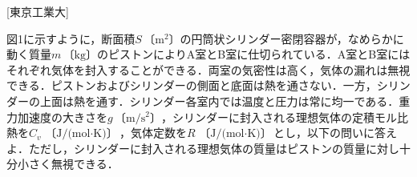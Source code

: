 


\noindent
{} [東京工業大]

図1に示すように，断面積$S \,\text{〔m${}^2$〕}$の円筒状シリンダー密閉容器が，なめらかに動く質量$m\,\text{〔kg〕}$のピストンによりA室とB室に仕切られている．A室とB室にはそれぞれ気体を封入することができる．両室の気密性は高く，気体の漏れは無視できる．ピストンおよびシリンダーの側面と底面は熱を通さない．一方，シリンダーの上面は熱を通す．シリンダー各室内では温度と圧力は常に均一である．重力加速度の大きさを$g\, \text{〔m/s${}^2$〕}$，シリンダーに封入される理想気体の定積モル比熱を$C_v\, \text{〔J/(mol$\cdot$K)〕}$，気体定数を$R\, \text{〔J/(mol$\cdot$K)〕}$とし，以下の問いに答えよ．ただし，シリンダーに封入される理想気体の質量はピストンの質量に対し十分小さく無視できる．

